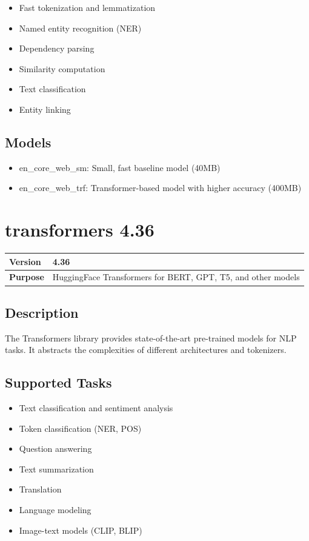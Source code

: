 \documentclass[12pt,a4paper]{report}
\begin{document}
\begin{itemize}
    \item Fast tokenization and lemmatization
    \item Named entity recognition (NER)
    \item Dependency parsing
    \item Similarity computation
    \item Text classification
    \item Entity linking
\end{itemize}

\subsection{Models}

\begin{itemize}
    \item en\_core\_web\_sm: Small, fast baseline model (40MB)
    \item en\_core\_web\_trf: Transformer-based model with higher accuracy (400MB)
\end{itemize}

\section{transformers 4.36}

\begin{tabular}{|p{4cm}|p{10cm}|}
\hline
\textbf{Version} & 4.36 \\
\hline
\textbf{Purpose} & HuggingFace Transformers for BERT, GPT, T5, and other models \\
\hline
\end{tabular}

\subsection{Description}

The Transformers library provides state-of-the-art pre-trained models for NLP tasks. It abstracts the complexities of different architectures and tokenizers.

\subsection{Supported Tasks}

\begin{itemize}
    \item Text classification and sentiment analysis
    \item Token classification (NER, POS)
    \item Question answering
    \item Text summarization
    \item Translation
    \item Language modeling
    \item Image-text models (CLIP, BLIP)
\end{itemize}
\end{document}
